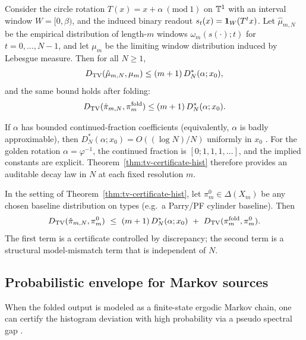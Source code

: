 \begin{theorem}\label{thm:tv-certificate-hist}
Consider the circle rotation $T(x)=x+\alpha\ (\mathrm{mod}\ 1)$ on $\mathbb{T}^1$ with an interval window $W=[0,\beta)$, and the induced binary readout $s_t(x)=\mathbf{1}_W(T^t x)$.
Let $\hat{\mu}_{m,N}$ be the empirical distribution of length-$m$ windows $\omega_m(s(\cdot);t)$ for $t=0,\dots,N-1$, and let $\mu_m$ be the limiting window distribution induced by Lebesgue measure.
Then for all $N\ge 1$,
\[
D_{\mathrm{TV}}(\hat{\mu}_{m,N},\mu_m)\le (m+1)\,D_N^*(\alpha;x_0),
\]
and the same bound holds after folding:
\[
D_{\mathrm{TV}}(\hat{\pi}_{m,N},\pi_m^{\mathrm{fold}})\le (m+1)\,D_N^*(\alpha;x_0).
\]
\end{theorem}

\begin{remark}\label{rem:cert-discrepancy-rate}
If $\alpha$ has bounded continued-fraction coefficients (equivalently, $\alpha$ is badly approximable), then
$
D_N^*(\alpha;x_0)=O((\log N)/N)
$
uniformly in $x_0$ \cite{KuipersNiederreiter1974}.
For the golden rotation $\alpha=\varphi^{-1}$, the continued fraction is $[0;1,1,1,\dots]$, and the implied constants are explicit.
Theorem~\ref{thm:tv-certificate-hist} therefore provides an auditable decay law in $N$ at each fixed resolution $m$.
\end{remark}

\begin{corollary}\label{cor:tv-decomposition-baseline}
In the setting of Theorem~\ref{thm:tv-certificate-hist}, let $\pi_m^{0}\in\Delta(X_m)$ be any chosen baseline distribution on types (e.g.\ a Parry/PF cylinder baseline).
Then
\[
\TV(\hat{\pi}_{m,N},\pi_m^{0})\ \le\ (m+1)\,D_N^*(\alpha;x_0)\ +\ \TV(\pi_m^{\mathrm{fold}},\pi_m^{0}).
\]
The first term is a certificate controlled by discrepancy; the second term is a structural model-mismatch term that is independent of $N$.
\end{corollary}

\subsection{Probabilistic envelope for Markov sources}\label{subsec:cert-markov}
When the folded output is modeled as a finite-state ergodic Markov chain, one can certify the histogram deviation with high probability via a pseudo spectral gap \cite{Paulin2015MarkovConcentration}.

